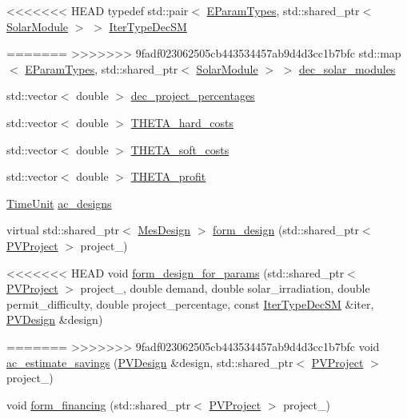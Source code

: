 \begin{DoxyCompactItemize}
\item 
<<<<<<< HEAD
typedef std\+::pair$<$ \hyperlink{namespacesolar__core_aa1147341e5ef7a40d68d1bd68e149362}{E\+Param\+Types}, std\+::shared\+\_\+ptr$<$ \hyperlink{classsolar__core_1_1_solar_module}{Solar\+Module} $>$ $>$ \hyperlink{classsolar__core_1_1_s_e_i_a039ba7d0f4561aec82bd96636de534a5}{Iter\+Type\+Dec\+S\+M}
\item 
=======
>>>>>>> 9fadf023062505cb443534457ab9d4d3cc1b7bfc
std\+::map$<$ \hyperlink{namespacesolar__core_aa1147341e5ef7a40d68d1bd68e149362}{E\+Param\+Types}, std\+::shared\+\_\+ptr$<$ \hyperlink{classsolar__core_1_1_solar_module}{Solar\+Module} $>$ $>$ \hyperlink{classsolar__core_1_1_s_e_i_a79728143af5752e09c2be29cfa1cfd8f}{dec\+\_\+solar\+\_\+modules}
\item 
std\+::vector$<$ double $>$ \hyperlink{classsolar__core_1_1_s_e_i_a272838ea17b8cd4e49c9a8c53facfd8f}{dec\+\_\+project\+\_\+percentages}
\item 
std\+::vector$<$ double $>$ \hyperlink{classsolar__core_1_1_s_e_i_a4723f6d0e5098b9b2f553c9ef6c5545f}{T\+H\+E\+T\+A\+\_\+hard\+\_\+costs}
\item 
std\+::vector$<$ double $>$ \hyperlink{classsolar__core_1_1_s_e_i_a1be690a943dc872af0ed3540c81f1d6b}{T\+H\+E\+T\+A\+\_\+soft\+\_\+costs}
\item 
std\+::vector$<$ double $>$ \hyperlink{classsolar__core_1_1_s_e_i_a9137f81a58ab1325d8b37590afe267aa}{T\+H\+E\+T\+A\+\_\+profit}
\item 
\hyperlink{namespacesolar__core_a4b5949d07259da6f8a20d12a30403e90}{Time\+Unit} \hyperlink{classsolar__core_1_1_s_e_i_a147ec60ca551d9195cdf5937eda5f903}{ac\+\_\+designs}
\item 
virtual std\+::shared\+\_\+ptr$<$ \hyperlink{classsolar__core_1_1_mes_design}{Mes\+Design} $>$ \hyperlink{classsolar__core_1_1_s_e_i_a807561ad055ddc0df91b80ba406ee6df}{form\+\_\+design} (std\+::shared\+\_\+ptr$<$ \hyperlink{classsolar__core_1_1_p_v_project}{P\+V\+Project} $>$ project\+\_\+)
\item 
<<<<<<< HEAD
void \hyperlink{classsolar__core_1_1_s_e_i_a0019e2ad3504adcb5a44e5002f1d0002}{form\+\_\+design\+\_\+for\+\_\+params} (std\+::shared\+\_\+ptr$<$ \hyperlink{classsolar__core_1_1_p_v_project}{P\+V\+Project} $>$ project\+\_\+, double demand, double solar\+\_\+irradiation, double permit\+\_\+difficulty, double project\+\_\+percentage, const \hyperlink{classsolar__core_1_1_s_e_i_a039ba7d0f4561aec82bd96636de534a5}{Iter\+Type\+Dec\+S\+M} \&iter, \hyperlink{classsolar__core_1_1_p_v_design}{P\+V\+Design} \&design)
\item 
=======
>>>>>>> 9fadf023062505cb443534457ab9d4d3cc1b7bfc
void \hyperlink{classsolar__core_1_1_s_e_i_ab84401c625f5c459accf430535e4a06d}{ac\+\_\+estimate\+\_\+savings} (\hyperlink{classsolar__core_1_1_p_v_design}{P\+V\+Design} \&design, std\+::shared\+\_\+ptr$<$ \hyperlink{classsolar__core_1_1_p_v_project}{P\+V\+Project} $>$ project\+\_\+)
\item 
void \hyperlink{classsolar__core_1_1_s_e_i_a7f29b9fee74b984ed9b1c6983b2960e3}{form\+\_\+financing} (std\+::shared\+\_\+ptr$<$ \hyperlink{classsolar__core_1_1_p_v_project}{P\+V\+Project} $>$ project\+\_\+)
\end{DoxyCompactItemize}
